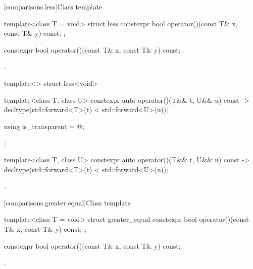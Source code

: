[comparisons.less]{Class template }

%
\begin{itemdecl}
template<class T = void> struct less {
  constexpr bool operator()(const T& x, const T& y) const;
};
\end{itemdecl}

%
\begin{itemdecl}
constexpr bool operator()(const T& x, const T& y) const;
\end{itemdecl}

\begin{itemdescr}
\pnum
\returns
{}.
\end{itemdescr}

%
\begin{itemdecl}
template<> struct less<void> {
  template<class T, class U> constexpr auto operator()(T&& t, U&& u) const
    -> decltype(std::forward<T>(t) < std::forward<U>(u));

  using is_transparent = @\unspec@;
};
\end{itemdecl}

%
\begin{itemdecl}
template<class T, class U> constexpr auto operator()(T&& t, U&& u) const
  -> decltype(std::forward<T>(t) < std::forward<U>(u));
\end{itemdecl}

\begin{itemdescr}
\pnum
\returns
{}.
\end{itemdescr}

[comparisons.greater.equal]{Class template }

%
\begin{itemdecl}
template<class T = void> struct greater_equal {
  constexpr bool operator()(const T& x, const T& y) const;
};
\end{itemdecl}

%
\begin{itemdecl}
constexpr bool operator()(const T& x, const T& y) const;
\end{itemdecl}

\begin{itemdescr}
\pnum
\returns
{}.
\end{itemdescr}

